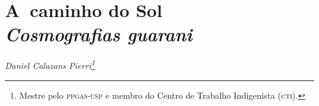 
\chapter*{A~caminho do Sol\\
\large{\emph{Cosmografias guarani}}}


\begin{flushright}
\emph{Daniel Calazans Pierri\footnote{Mestre pelo \textsc{ppgas}-\textsc{usp} e membro do
Centro de Trabalho Indigenista (\textsc{cti}).}}
\end{flushright}
\bigskip

